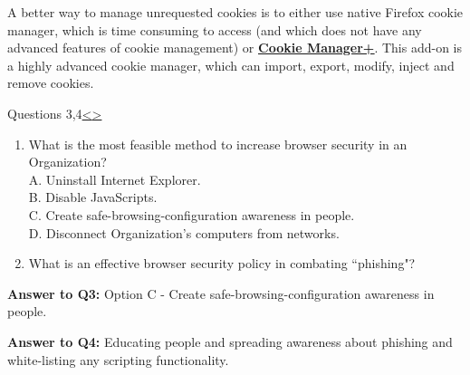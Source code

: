 \documentclass[12pt]{extarticle}
\newenvironment{instructionblock}{\Large\bgroup}{\egroup}
\begin{document}
	A better way to manage unrequested cookies is to either use native Firefox cookie manager, which is time consuming to access (and which does not have any advanced features of cookie management) or \href{https://addons.mozilla.org/en-US/firefox/addon/cookies-manager-plus/}{\textbf{\underline{Cookie Manager+}}}. This add-on is a highly advanced cookie manager, which can import, export, modify, inject and remove cookies. 








	\pagebreak
	\begin{slide}{Questions 3,4}{\hyperref[slide 12]{\textless}\hyperref[slide 14]{\textgreater}}
		\vskip 5pt
		\begin{instructionblock}
			\begin{enumerate}
				\item What is the most feasible method to increase browser security in an Organization?\\
				A. Uninstall Internet Explorer.\\
				B. Disable JavaScripts.\\
				C. Create safe-browsing-configuration awareness in people.\\
				D. Disconnect Organization's computers from networks.
				
				\item What is an effective browser security policy in combating ``phishing"?
			\end{enumerate}
		\end{instructionblock}
	\end{slide}
	\vfill


	\textbf{Answer to Q3:} Option C - Create safe-browsing-configuration awareness in people.
	
	\vspace{4mm}
	\textbf{Answer to Q4:} Educating people and spreading awareness about phishing and white-listing any scripting functionality. 



	
	
	
\end{document}
